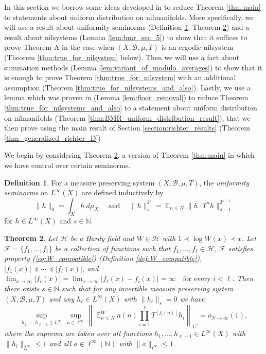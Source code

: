 \documentclass[12pt]{article}
\theoremstyle{plain} %
\newtheorem{theorem}{Theorem}[section]
\theoremstyle{definition} %
\newtheorem{definition}[theorem]{Definition}
\theoremstyle{plain}
\theoremstyle{plain}
\numberwithin{equation}{section}
\newcommand{\N}{\mathbb{N}}
\renewcommand{\leq}{\leqslant}
\newcommand{\1}{\mathbbm{1}}
\newcommand{\E}{\operatorname{\mathbb{E}}}
\newcommand{\oo}{\infty}
\begin{document}
 In this section we borrow some ideas developed in \cite{BMR24} to reduce Theorem \ref{thm:main} to statements about uniform distribution on nilmanifolds. More specifically, we will use a result about uniformity seminorms (Definition \ref{def:uniformity_seminorms}, Theorem \ref{thm:generalized_BMR_4.2}) and a result about nilsystems (Lemma \ref{lem:bmr_sec_5}) to show that it suffices to prove Theorem A in the case when $(X,\mathscr{B},\mu,T)$ is an ergodic nilsystem (Theorem \ref{thm:true_for_nilsystem} below). Then we will use a fact about summation methods (Lemma \ref{lem:variant_of_modulo_averages}) to show that it is enough to prove Theorem \ref{thm:true_for_nilsystem} with an additional assumption (Theorem \ref{thm:true_for_nilsystems_and_also}). Lastly, we use a lemma which was proven in \cite{BMR24} (Lemma \ref{lem:floor_removal}) to reduce Theorem \ref{thm:true_for_nilsystems_and_also} to a statement about uniform distribution on nilmanifolds (Theorem \ref{thm:BMR_uniform_distribution_result}), that we then prove using the main result of Section \ref{section:richter_results} (Theorem \ref{thm_generalized_richter_D})
 
 
We begin by considering Theorem \ref{thm:generalized_BMR_4.2}, a version of Theorem \ref{thm:main} in which we have control over certain seminorms.


\begin{definition}\label{def:uniformity_seminorms}
    For a measure preserving system $(X,\mathscr{B},\mu,T)$, the \emph{uniformity seminorms} on $L^{\oo}(X)$ are defined inductively by 
    \begin{equation*}
        \|h\|_0 = \int_X h~d\mu_X\quad \text{ and }\quad \|h\|_{s}^{2^s} = \E_{n\leq N}\|\overline{h}\cdot T^nh\|_{s-1}^{2^{s-1}}
    \end{equation*}
    for $h\in L^{\oo}(X)$ and $s\in \N$.
\end{definition}
\begin{theorem}\label{thm:generalized_BMR_4.2}
Let $\mathcal{H}$ be a Hardy field and $W \in \mathcal{H}$ with
$1 \prec \log W(x) \prec x$.
Let $\mathscr{F} = \{f_1,\ldots,f_{\ell}\}$ be a collection of functions such that $ f_1,\ldots,f_{\ell}\in \mathcal{H}$, $\mathscr{F}$ satisfies property (\ref{eq:W_compatible}) (Definition \ref{def:W_compatible}), $|f_1(x)| \preceq \cdots \preceq |f_{\ell}(x)|$, and $
\lim_{x\to\infty} |f_{\ell}(x)|=\lim_{x\to\infty} |f_{\ell}(x)-f_i(x)|
=
\infty
\quad \text{for every } i<\ell$. Then there exists $s\in\mathbb{N}$ such that for any invertible
measure preserving system $(X,\mathcal{B},\mu,T)$ and any $h_{\ell}\in L^\infty(X)$ with $\|h_{\ell}\|_s=0$ we have
\begin{equation}\label{eq:4.2_goal}
\sup_{h_1,\ldots,h_{\ell-1}\in L^\infty}
\ \sup_{a\in \ell^\infty}
\left\|
\E_{n\leq N}^Wa(n)
\prod_{i=1}^{\ell} T^{[f_i(n)]}h_i
\right\|_{L^2}
=
o_{N\to\infty}(1),
\end{equation}
where the suprema are taken over all functions
$h_1,\ldots,h_{\ell-1}\in L^\infty(X)$ with
$\|h_i\|_{L^\infty}\le 1$
and all $a\in \ell^\infty(\mathbb{N})$ with
$\|a\|_{\ell^\infty}\le 1$.
\end{theorem}
\end{document}
